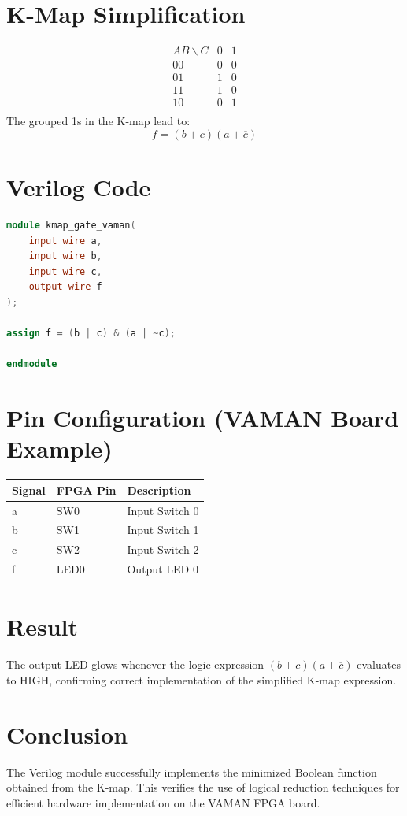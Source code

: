 \documentclass[a4paper,12pt]{article}
\begin{document}
\section*{K-Map Simplification}
\[
\begin{array}{c|cccc}
AB \backslash C & 0 & 1 \\ \hline
00 & 0 & 0 \\
01 & 1 & 0 \\
11 & 1 & 0 \\
10 & 0 & 1 \\
\end{array}
\]
The grouped 1s in the K-map lead to:
\[
f = (b + c)(a + \overline{c})
\]

\section*{Verilog Code}
\begin{lstlisting}[language=Verilog, caption={Verilog Code for K-Map Simplified Logic Function}]
module kmap_gate_vaman(
    input wire a,
    input wire b,
    input wire c,
    output wire f
);

assign f = (b | c) & (a | ~c);

endmodule
\end{lstlisting}

\section*{Pin Configuration (VAMAN Board Example)}
\begin{center}
\begin{tabular}{lll}
\toprule
\textbf{Signal} & \textbf{FPGA Pin} & \textbf{Description} \\
\midrule
a & SW0 & Input Switch 0 \\
b & SW1 & Input Switch 1 \\
c & SW2 & Input Switch 2 \\
f & LED0 & Output LED 0 \\
\bottomrule
\end{tabular}
\end{center}

\section*{Result}
The output LED glows whenever the logic expression \((b + c)(a + \overline{c})\) evaluates to HIGH, confirming correct implementation of the simplified K-map expression.

\section*{Conclusion}
The Verilog module successfully implements the minimized Boolean function obtained from the K-map.  
This verifies the use of logical reduction techniques for efficient hardware implementation on the VAMAN FPGA board.
\end{document}
